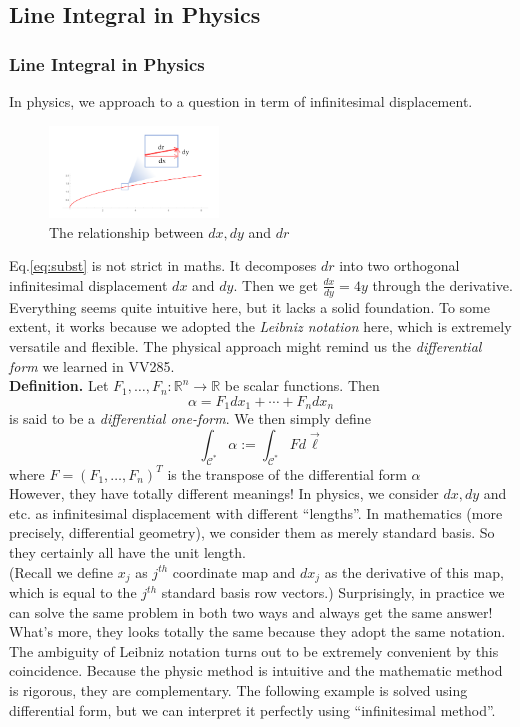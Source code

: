 \documentclass[11pt, t]{beamer}
\renewcommand{\emph}[1]{{\color{Turquoise3}\textsl{#1}}}
\newcommand{\nullspace}{~\\[15pt]}
\begin{document}
\subsection{Line Integral in Physics}
\begin{frame}[allowframebreaks]
    \frametitle{Line Integral in Physics}
    In physics, we approach to a question in term of infinitesimal displacement.
    \begin{figure}[H]
        \centering
        \includegraphics[width=0.4\textwidth]{2020-07-15-15-30-11.png}
        \caption{The relationship between $dx, dy$ and $dr$}
    \end{figure}
    Eq.\ref{eq:subst} is not strict in maths. It decomposes $dr$ into two orthogonal infinitesimal displacement $dx$ and $dy$. Then we get $\frac{dx}{dy}=4y$ through the derivative. Everything seems quite intuitive here, but it lacks a solid foundation. To some extent, it works because we adopted the \emph{Leibniz notation} here, which is extremely versatile and flexible.
    \newpage
    The physical approach might remind us the \emph{differential form} we learned in VV285.\nullspace
    \textbf{Definition. }Let $F_{1}, \ldots, F_{n}: \mathbb{R}^{n} \rightarrow \mathbb{R}$ be scalar functions. Then
    \[
        \alpha=F_{1} d x_{1}+\cdots+F_{n} d x_{n}
    \]
    is said to be a \emph{differential one-form}. We then simply define
    \[
        \int_{\mathcal{C}^{*}} \alpha:=\int_{\mathcal{C}^{*}} F d \vec{\ell}
    \]
    where $F=\left(F_{1}, \ldots, F_{n}\right)^{T}$ is the transpose of the differential form $\alpha$\nullspace
    \newpage
    However, they have totally different meanings! In physics, we consider $dx,dy$ and etc. as infinitesimal displacement with different ``lengths''. In mathematics (more precisely, differential geometry), we consider them as merely standard basis. So they certainly all have the unit length.
    \nullspace
    (Recall we define $x_j$ as $j^{th}$ coordinate map and $dx_j$ as the derivative of this map, which is equal to the $j^{th}$ standard basis row vectors.)
    \newpage
    Surprisingly, in practice we can solve the same problem in both two ways and always get the same answer! What's more, they looks totally the same because they adopt the same notation. The ambiguity of Leibniz notation turns out to be extremely convenient by this coincidence. Because the physic method is intuitive and the mathematic method is rigorous, they are complementary. The following example is solved using differential form, but we can interpret it perfectly using ``infinitesimal method''.\\[8pt]

\end{frame}
\end{document}
